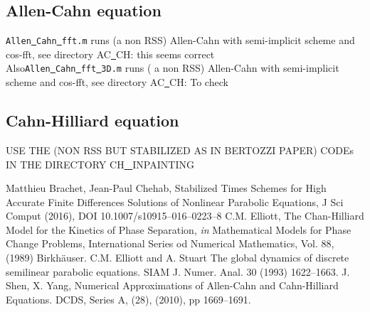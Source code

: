 \documentclass[11pt]{article}
\begin{document}
\subsection{Allen-Cahn equation}
{\tt Allen\underline{\ }Cahn\underline{\ }fft.m} runs (a non RSS) Allen-Cahn with semi-implicit scheme and cos-fft, see directory AC\underline{\ }CH: this seems correct\\
Also{\tt Allen\underline{\ }Cahn\underline{\ }fft\underline{\ }3D.m} runs ( a non RSS) Allen-Cahn with semi-implicit scheme and cos-fft, see directory AC\underline{\ }CH: To check

\subsection{Cahn-Hilliard equation}
USE THE (NON RSS BUT STABILIZED AS IN BERTOZZI PAPER) CODEs IN THE DIRECTORY
CH\underline{ \ }INPAINTING
%
%
\begin{thebibliography}{99}
 Matthieu Brachet, Jean-Paul Chehab,
Stabilized Times Schemes for High Accurate Finite
Differences Solutions of Nonlinear Parabolic Equations, J Sci Comput (2016),
DOI 10.1007/s10915--016--0223--8
 C.M. Elliott, The Chan-Hilliard Model for the Kinetics of Phase Separation, 
{\it in} Mathematical Models for Phase Change Problems, International Series od Numerical Mathematics, Vol. 88, (1989) Birkh\"auser.
 C.M. Elliott and A. Stuart The global dynamics of discrete semilinear parabolic equations. SIAM J. Numer. Anal. 30 (1993) 1622--1663.
 J. Shen, X. Yang, Numerical Approximations of Allen-Cahn and Cahn-Hilliard Equations. DCDS, Series A, (28), (2010), pp 1669--1691.
\end{thebibliography}
\end{document}
